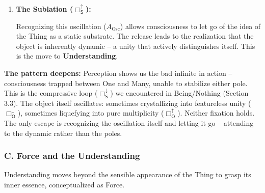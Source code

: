 \documentclass[12pt]{book}
\newcommand{\SBoxUp}{\Box_{\mathsf{S}}^{\uparrow}}
\begin{document}
\begin{enumerate}
Like the Being/Nothing oscillation, this is a compressive loop without qualitative transformation. Consciousness remains imprisoned in the First Negation, unable to stabilize either pole.

\item \textbf{The Sublation ($\SBoxUp$):}

Recognizing this oscillation ($A_{\mathrm{Osc}}$) allows consciousness to let go of the idea of the Thing as a static substrate. The release leads to the realization that the object is inherently dynamic -- a unity that actively distinguishes itself. This is the move to \textbf{Understanding}.
\end{enumerate}

\textbf{The pattern deepens:} Perception shows us the bad infinite in action -- consciousness trapped between One and Many, unable to stabilize either pole. This is the compressive loop ($\Box_{\mathsf{S}}^{\downarrow}$) we encountered in Being/Nothing (Section 3.3). The object itself oscillates: sometimes crystallizing into featureless unity ($\Box_{\mathsf{O}}^{\downarrow}$), sometimes liquefying into pure multiplicity ($\Box_{\mathsf{O}}^{\uparrow}$). Neither fixation holds. The only escape is recognizing the oscillation itself and letting it go -- attending to the dynamic rather than the poles.

\subsubsection{C. Force and the Understanding}

Understanding moves beyond the sensible appearance of the Thing to grasp its inner essence, conceptualized as Force.
\end{document}
